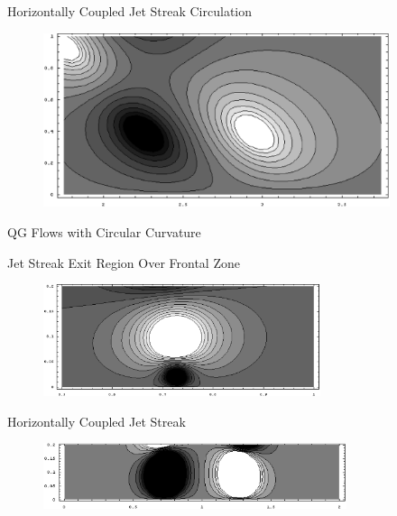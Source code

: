 \documentclass[landscape]{seminar}
\begin{document}
\begin{slide}

\begin{center}
Horizontally Coupled Jet Streak Circulation
\begin{figure}
\includegraphics[width=4in]{img/sg_slope_n16_s05_2topjet.eps}
\end{figure}
\end{center}

\end{slide}
\begin{slide}

\begin{center}
{\color{darkblue} \large QG Flows with Circular Curvature}

Jet Streak Exit Region Over Frontal Zone
\begin{figure}
\includegraphics[width=3.2in]{img/qg_curve_n16_2src_atop.eps}
\end{figure}
Horizontally Coupled Jet Streak
\begin{figure}
\includegraphics[width=3.5in]{img/qg_curve_n16_2topjet.eps}
\end{figure}
\end{center}

\end{slide}
\end{document}
